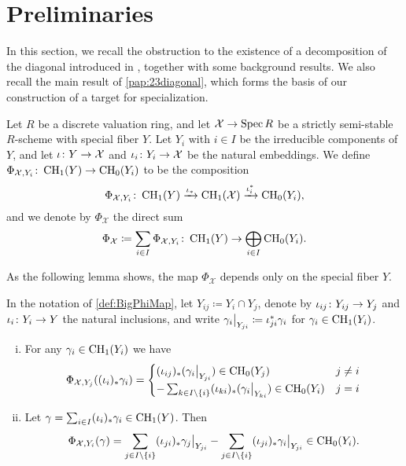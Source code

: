 \section{Preliminaries}
In this section, we recall the obstruction to the existence of a decomposition of the diagonal introduced in \cite{PavicSchreieder}, together with some background results. We also recall the main result of \cref{pap:23diagonal}, which forms the basis of our construction of a target for specialization.

\begin{definition}
  \label{def:BigPhiMap}
  Let $R$ be a discrete valuation ring, and let $\mathcal{X} \to \operatorname{Spec} R$ be a strictly semi-stable $R$-scheme with special fiber $Y$. Let $Y_i$ with $i \in I$ be the irreducible components of $Y$, and let $\iota \colon Y \to \mathcal{X}$ and $\iota_i \colon Y_i \to \mathcal{X}$ be the natural embeddings. We define $\Phi_{\mathcal{X},Y_i} \colon \operatorname{CH}_1(Y) \to \operatorname{CH}_0(Y_i)$ to be the composition
\[ \Phi_{\mathcal{X},Y_i} \colon \operatorname{CH}_1(Y) \xrightarrow{\iota_*} \operatorname{CH}_1(\mathcal{X}) \xrightarrow{\iota_i^*} \operatorname{CH}_0(Y_i), \]
and we denote by $\Phi_{\mathcal{X}}$ the direct sum
\[ \Phi_{\mathcal{X}} \coloneqq \sum_{i \in I}  \Phi_{\mathcal{X},Y_i}  \colon \operatorname{CH}_1(Y) \to  \bigoplus_{i \in I}\operatorname{CH}_0(Y_i).\]
\end{definition}

As the following lemma shows, the map $\Phi_{\mathcal{X}}$ depends only on the special fiber $Y$.
\begin{lemma}
  \label{lem:BigPhiSpecial}
  In the notation of \cref{def:BigPhiMap}, let $Y_{ij} \coloneqq Y_i \cap Y_j$, denote by $\iota_{ij} \colon Y_{ij} \to Y_j$ and $\iota_i \colon Y_i \to Y$ the natural inclusions, and write $\restr{\gamma_i}{Y_{ji}} \coloneqq \iota_{ji}^*\gamma_i$ for $\gamma_i \in \operatorname{CH}_1(Y_i)$.   
  \begin{enumerate}[i)]
  \item For any $\gamma_i \in \operatorname{CH}_1(Y_i)$ we have
\[\Phi_{\mathcal{X},Y_j}((\iota_i)_*\gamma_i) = 
\begin{cases}
  (\iota_{ij})_*(\restr{\gamma_i}{Y_{ji}}) \in \CH_0(Y_j) & j \neq i \\
  -\sum_{k \in I \setminus \set{i}} (\iota_{ki})_*(\restr{\gamma_i}{Y_{ki}}) \in \CH_0(Y_i) & j = i
\end{cases}
 \]
\item Let $\gamma = \sum_{i \in I} (\iota_i)_* \gamma_i \in \operatorname{CH}_1(Y)$. Then
\[\Phi_{\mathcal{X},Y_i}(\gamma) = \sum_{j \in I \setminus \set{i}} (\iota_{ji})_* \restr{\gamma_j}{Y_{ji}} - \sum_{j \in I \setminus \set{i}} (\iota_{ji})_* \restr{\gamma_i}{Y_{ji}} \in \CH_0(Y_i). \]
  \end{enumerate}
\end{lemma}

